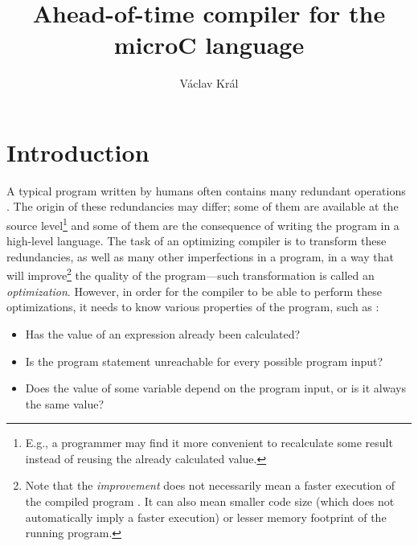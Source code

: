 \documentclass[thesis=M,english]{FITthesis}[2019/12/23]
\title{Ahead-of-time compiler for the microC language}
\author{Václav Král} %
\begin{document}

\chapter{Introduction}
A typical program written by humans often contains many redundant operations \cite[Chap. 9.1.1]{dragonbook}. The origin of these redundancies may differ; some of them are available at the source level\footnote{E.g., a programmer may find it more convenient to recalculate some result instead of reusing the already calculated value.} and some of them are the consequence of writing the program in a high-level language. The task of an optimizing compiler is to transform these redundancies, as well as many other imperfections in a program, in a way that will improve\footnote{Note that the \emph{improvement} does not necessarily mean a faster execution of the compiled program \cite[Chap. 8.1]{eng_comp}. It can also mean smaller code size (which does not automatically imply a faster execution) or lesser memory footprint of the running program.} the quality of the program---such transformation is called an \emph{optimization}. However, in order for the compiler to be able to perform these optimizations, it needs to know various properties of the program, such as \cite[Chap 1.1]{spa}:
\begin{itemize}
    \item Has the value of an expression already been calculated?
    \item Is the program statement unreachable for every possible program input?
    \item Does the value of some variable depend on the program input, or is it always the same value?
\end{itemize}
\end{document}
